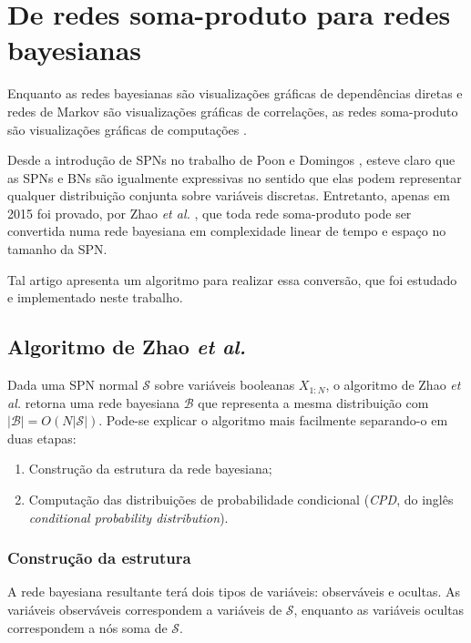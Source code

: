 \chapter{De redes soma-produto para redes bayesianas}
\label{cap:desenvolvimento}

Enquanto as redes bayesianas são visualizações gráficas de dependências diretas e redes de Markov são visualizações gráficas de correlações, as redes soma-produto são visualizações gráficas de computações \cite{Poupart2017}.

Desde a introdução de SPNs no trabalho de Poon e Domingos \cite{Poon2012}, esteve claro que as SPNs e BNs são igualmente expressivas no sentido que elas podem representar qualquer distribuição conjunta sobre variáveis discretas. Entretanto, apenas em 2015 foi provado, por Zhao \emph{et al.} \cite{Zhao2015}, que toda rede soma-produto pode ser convertida numa rede bayesiana em complexidade linear de tempo e espaço no tamanho da SPN.

Tal artigo apresenta um algoritmo para realizar essa conversão, que foi estudado e implementado neste trabalho.

\section{Algoritmo de Zhao \emph{et al.}}

Dada uma SPN normal $\mathcal{S}$ sobre variáveis booleanas $X_{1:N}$, o algoritmo de Zhao \emph{et al.} \cite{Zhao2015} retorna uma rede bayesiana $\mathcal{B}$ que representa a mesma distribuição com $|\mathcal{B}| = O(N|\mathcal{S}|)$. Pode-se explicar o algoritmo mais facilmente separando-o em duas etapas:

\begin{enumerate}
  \item Construção da estrutura da rede bayesiana;
  \item Computação das distribuições de probabilidade condicional (\emph{CPD}, do inglês \emph{conditional probability distribution}).
\end{enumerate}

\subsection{Construção da estrutura}

A rede bayesiana resultante terá dois tipos de variáveis: observáveis e ocultas. As variáveis observáveis correspondem a variáveis de $\mathcal{S}$, enquanto as variáveis ocultas correspondem a nós soma de $\mathcal{S}$.

